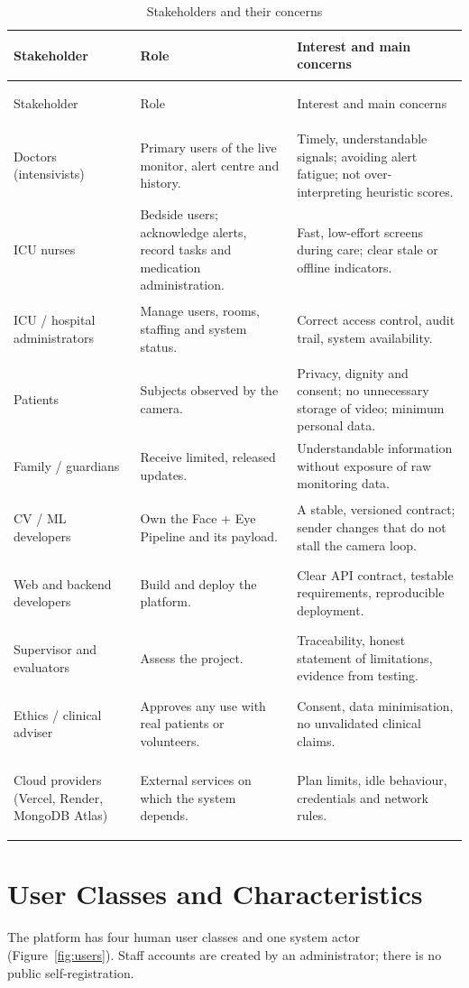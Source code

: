 \documentclass[a4paper,11pt]{scrreprt}
\begin{document}
\begin{longtable}{@{}>{\bfseries\raggedright\arraybackslash}p{3.2cm}>{\raggedright\arraybackslash}p{4.6cm}>{\raggedright\arraybackslash}p{7.2cm}@{}}
\caption{Stakeholders and their concerns}\\
\toprule Stakeholder & Role & Interest and main concerns\\ \midrule \endfirsthead
\toprule Stakeholder & Role & Interest and main concerns\\ \midrule \endhead
\bottomrule \endfoot
Doctors (intensivists) & Primary users of the live monitor, alert centre and history. & Timely, understandable signals; avoiding alert fatigue; not over-interpreting heuristic scores.\\ \midrule
ICU nurses & Bedside users; acknowledge alerts, record tasks and medication administration. & Fast, low-effort screens during care; clear stale or offline indicators.\\ \midrule
ICU / hospital administrators & Manage users, rooms, staffing and system status. & Correct access control, audit trail, system availability.\\ \midrule
Patients & Subjects observed by the camera. & Privacy, dignity and consent; no unnecessary storage of video; minimum personal data.\\ \midrule
Family / guardians & Receive limited, released updates. & Understandable information without exposure of raw monitoring data.\\ \midrule
CV / ML developers & Own the Face + Eye Pipeline and its payload. & A stable, versioned contract; sender changes that do not stall the camera loop.\\ \midrule
Web and backend developers & Build and deploy the platform. & Clear API contract, testable requirements, reproducible deployment.\\ \midrule
Supervisor and evaluators & Assess the project. & Traceability, honest statement of limitations, evidence from testing.\\ \midrule
Ethics / clinical adviser & Approves any use with real patients or volunteers. & Consent, data minimisation, no unvalidated clinical claims.\\ \midrule
Cloud providers (Vercel, Render, MongoDB Atlas) & External services on which the system depends. & Plan limits, idle behaviour, credentials and network rules.\\
\end{longtable}

\section{User Classes and Characteristics}\label{sec:users}
The platform has four human user classes and one system actor (Figure~\ref{fig:users}). Staff accounts are created by an administrator; there is no public self-registration.
\end{document}
